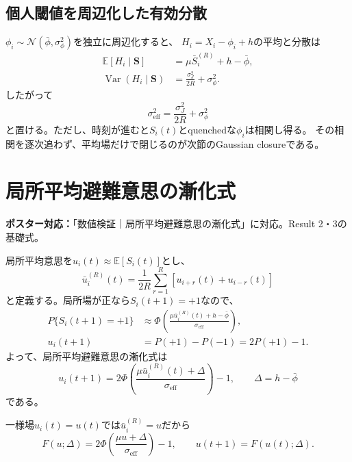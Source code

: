 \documentclass[a4paper,12pt]{ltjsarticle}
\newcommand{\PosterMap}[1]{%
  \begin{tcolorbox}[enhanced,boxrule=0pt,arc=1mm,colback=softgray,
    left=2mm,right=2mm,top=1mm,bottom=1mm,before skip=0pt,after skip=0.7em]
  \normalsize\textbf{ポスター対応：}#1
  \end{tcolorbox}}
\newcommand{\NormalCDF}{\Phi}
\newcommand{\E}{\mathbb E}
\newcommand{\Var}{\operatorname{Var}}
\begin{document}
\subsection{個人閾値を周辺化した有効分散}

$\phi_i\sim\mathcal N(\bar\phi,\sigma_\phi^2)$を独立に周辺化すると、
$H_i=X_i-\phi_i+h$の平均と分散は
\begin{align}
 \E[H_i\mid\bm S]&=\mu\bar S_i^{(R)}+h-\bar\phi,\\
 \Var(H_i\mid\bm S)&=
 \frac{\sigma_J^2}{2R}+\sigma_\phi^2.
\end{align}
したがって
\begin{equation}
 \boxed{\sigma_{\mathrm{eff}}^2
 =\frac{\sigma_J^2}{2R}+\sigma_\phi^2}\label{eq:sigma-eff}
\end{equation}
と置ける。ただし、時刻が進むと$S_i(t)$とquenchedな$\phi_i$は相関し得る。
その相関を逐次追わず、平均場だけで閉じるのが次節のGaussian closureである。

\section{局所平均避難意思の漸化式}\label{sec:closure}
\PosterMap{「数値検証｜局所平均避難意思の漸化式」に対応。Result 2・3の基礎式。}

局所平均意思を$u_i(t)\approx\E[S_i(t)]$とし、
\begin{equation}
 \bar u_i^{(R)}(t)=\frac{1}{2R}\sum_{r=1}^{R}
 \left[u_{i+r}(t)+u_{i-r}(t)\right]\label{eq:local-u-average}
\end{equation}
と定義する。局所場が正なら$S_i(t+1)=+1$なので、
\begin{align}
 P\{S_i(t+1)=+1\}
 &\approx \NormalCDF\!\left(
 \frac{\mu\bar u_i^{(R)}(t)+h-\bar\phi}{\sigma_{\mathrm{eff}}}
 \right),\\
 u_i(t+1)
 &=P(+1)-P(-1)=2P(+1)-1.
\end{align}
よって、局所平均避難意思の漸化式は
\begin{equation}
 \boxed{
 u_i(t+1)=2\NormalCDF\!\left(
 \frac{\mu\bar u_i^{(R)}(t)+\Delta}{\sigma_{\mathrm{eff}}}
 \right)-1,
 \qquad \Delta=h-\bar\phi
 }\label{eq:closure-map}
\end{equation}
である。

一様場$u_i(t)=u(t)$では$\bar u_i^{(R)}=u$だから
\begin{equation}
 F(u;\Delta)=2\NormalCDF\!\left(
 \frac{\mu u+\Delta}{\sigma_{\mathrm{eff}}}\right)-1,
 \qquad u(t+1)=F(u(t);\Delta).\label{eq:uniform-map}
\end{equation}
\end{document}

